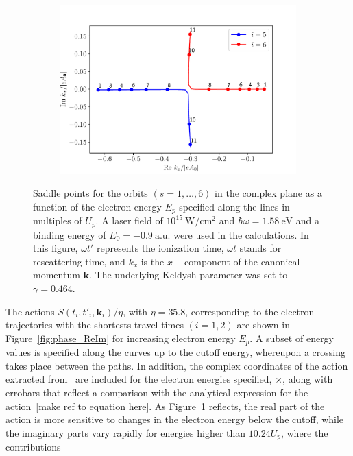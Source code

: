 \begin{figure}
\begin{subfigure}[b]{0.33\linewidth}
\end{subfigure}
\begin{subfigure}[b]{0.33\linewidth}
  \includegraphics[width=\textwidth]{figures/ch_ATI_SPA/rescattering/momentum56.pdf}
\end{subfigure}
\caption{Saddle points for the orbits $(s = 1,\dots,6)$ in the complex
  plane as a function of the electron energy $E_{p}$ specified along
  the lines in multiples of $U_{p}$. A laser field of
  $10^{15}\ \mathrm{W/cm^{2}}$ and $\hbar\omega = 1.58\ \mathrm{eV}$
  and a binding energy of $E_{0} = -0.9\ \mathrm{a.u.}$ were used in
  the calculations. In this figure, $\omega t'$ represents the
  ionization time, $\omega t$ stands for rescattering time, and
  $k_{x}$ is the $x-$component of the canonical momentum
  $\mathbf{k}$. The underlying Keldysh parameter was set to $\gamma =
  0.464$.}
  \label{fig:complex_paths}
\end{figure}

The actions $S(t_{i},t'_{i},\mathbf{k}_{i})/\eta$, with $\eta = 35.8$,
corresponding to the electron trajectories with the shortests travel
times $(i = 1, 2)$ are shown in Figure~\ref{fig:phase_ReIm} for
increasing electron energy $E_{p}$. A subset of energy values is
specified along the curves up to the cutoff energy, whereupon a
crossing takes place between the paths. In addition, the complex
coordinates of the action extracted from~\cite{phd_Kopold} are
included for the electron energies specified, $\times$, along with
errobars that reflect a comparison with the analytical expression for
the action~[make ref to equation here]. As
Figure~\ref{fig:complex_paths} reflects, the real part of the action
is more sensitive to changes in the electron energy below the cutoff,
while the imaginary parts vary rapidly for energies higher than $10.24
U_{p}$, where the contributions


